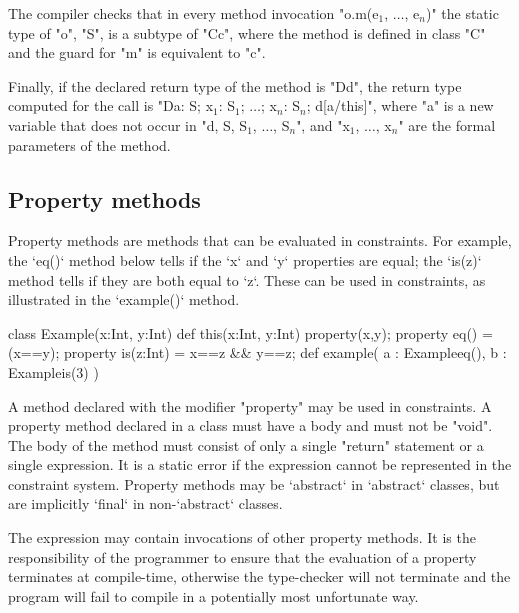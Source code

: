     The compiler checks that in every method invocation
    \xcdmath"o.m(e$_1$, $\dots$, e$_n$)"
    the static type of \xcd"o", \xcd"S", is a subtype of \xcd"C{c}", where the method
    is defined in class \xcd"C" and the guard for \xcd"m" is equivalent to
    \xcd"c".

    Finally, if the declared return type of the method is
    \xcd"D{d}", the
    return type computed for the call is
    \xcdmath"D{a: S; x$_1$: S$_1$; $\dots$; x$_n$: S$_n$; d[a/this]}",
    where \xcd"a" is a new
    variable that does not occur in
    \xcdmath"d, S, S$_1$, $\dots$, S$_n$", and
    \xcdmath"x$_1$, $\dots$, x$_n$" are the formal
    parameters of the method.




\subsection{Property methods}

Property methods are methods that can be evaluated in constraints.  
For example, the \xcd`eq()` method below tells if the \xcd`x` and \xcd`y`
properties are equal; the \xcd`is(z)` method tells if they are both equal to
\xcd`z`.  These can be used in constraints, as illustrated in the
\xcd`example()` method.
\begin{xten}
class Example(x:Int, y:Int) {
   def this(x:Int, y:Int) { property(x,y); }
   property eq() = (x==y);
   property is(z:Int) = x==z && y==z;
   def example( a : Example{eq()}, b : Example{is(3)} ) {}
}
\end{xten}
%


A method declared with the modifier \xcd"property" may be used
in constraints.  A property method declared in a class must have
a body and must not be \xcd"void".  The body of the method must
consist of only a single \xcd"return" statement or a single
expression.  It is a static error if the expression cannot be
represented in the constraint system.   Property methods may be \xcd`abstract`
in \xcd`abstract` classes, but are implicitly \xcd`final` in
non-\xcd`abstract` classes. 

The expression may contain invocations of other property methods. It is the
responsibility of the programmer to ensure that the evaluation of a property
terminates at compile-time, otherwise the type-checker will not terminate and
the program will fail to compile in a potentially most unfortunate way.


